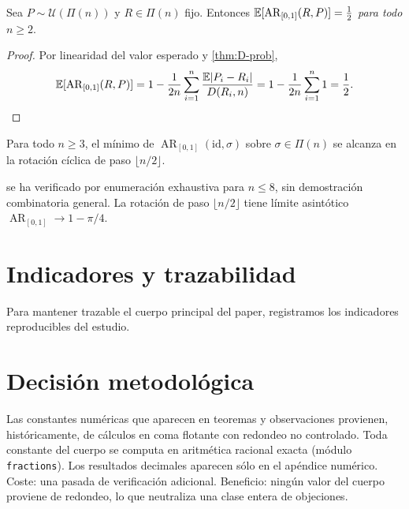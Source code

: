 \documentclass{claudeeditorial}
\newcommand{\ARop}{\operatorname{AR}_{[0,1]}}
\newcommand{\Perm}{\Pi}
\begin{document}
\begin{theorem}\label{thm:calibracion}
Sea $P\sim\mathcal{U}(\Perm(n))$ y $R\in\Perm(n)$ fijo. Entonces
$\E[\ARop(R,P)]=\tfrac{1}{2}$ \emph{para todo $n\ge 2$}.
\end{theorem}

\begin{proof}
Por linearidad del valor esperado y \cref{thm:D-prob},
\[
  \E[\ARop(R,P)]
  =1-\frac{1}{2n}\sum_{i=1}^{n}\frac{\E\abs{P_i-R_i}}{D(R_i,n)}
  =1-\frac{1}{2n}\sum_{i=1}^{n}1
  =\frac{1}{2}. \qedhere
\]
\end{proof}

\begin{conjetura}[mínimo de AR]\label{conj:argmin}
Para todo $n\ge 3$, el mínimo de $\ARop(\mathrm{id},\sigma)$ sobre
$\sigma\in\Perm(n)$ se alcanza en la rotación cíclica de paso
$\lfloor n/2\rfloor$.
\end{conjetura}

\begin{nota}
 se ha verificado por enumeración exhaustiva para
$n\le 8$, sin demostración combinatoria general. La rotación de paso
$\lfloor n/2\rfloor$ tiene límite asintótico $\ARop\to 1-\pi/4$.
\end{nota}

\section{Indicadores y trazabilidad}

Para mantener trazable el cuerpo principal del paper, registramos los
indicadores reproducibles del estudio.

\begin{tcbraster}[raster columns=4,raster equal height=rows,raster column skip=8pt]
\end{tcbraster}

\section{Decisión metodológica}

  {Las constantes numéricas que aparecen en teoremas y observaciones provienen, históricamente, de cálculos en coma flotante con redondeo no controlado.}
  {Toda constante del cuerpo se computa en aritmética racional exacta (módulo \texttt{fractions}). Los resultados decimales aparecen sólo en el apéndice numérico.}
  {Coste: una pasada de verificación adicional. Beneficio: ningún valor del cuerpo proviene de redondeo, lo que neutraliza una clase entera de objeciones.}
\end{document}
